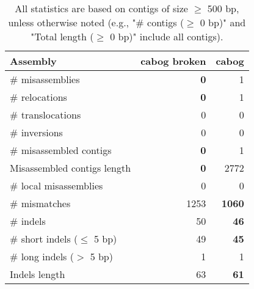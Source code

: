 \documentclass[12pt,a4paper]{article}
\begin{document}
\begin{table}[ht]
\begin{center}
\caption{All statistics are based on contigs of size $\geq$ 500 bp, unless otherwise noted (e.g., "\# contigs ($\geq$ 0 bp)" and "Total length ($\geq$ 0 bp)" include all contigs).}
\begin{tabular}{|l*{2}{|r}|}
\hline
Assembly & cabog broken & cabog \\ \hline
\# misassemblies & {\bf 0} & 1 \\ \hline
\hspace{5mm}\# relocations & {\bf 0} & 1 \\ \hline
\hspace{5mm}\# translocations & 0 & 0 \\ \hline
\hspace{5mm}\# inversions & 0 & 0 \\ \hline
\# misassembled contigs & {\bf 0} & 1 \\ \hline
Misassembled contigs length & {\bf 0} & 2772 \\ \hline
\# local misassemblies & 0 & 0 \\ \hline
\# mismatches & 1253 & {\bf 1060} \\ \hline
\# indels & 50 & {\bf 46} \\ \hline
\hspace{5mm}\# short indels ($\leq$ 5 bp) & 49 & {\bf 45} \\ \hline
\hspace{5mm}\# long indels ($>$ 5 bp) & 1 & 1 \\ \hline
Indels length & 63 & {\bf 61} \\ \hline
\end{tabular}
\end{center}
\end{table}
\end{document}
